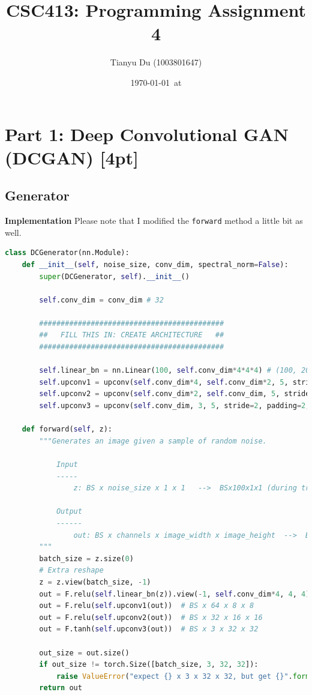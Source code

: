 \documentclass{article}
\title{CSC413: Programming Assignment 4}
\date{\today\ at \currenttime}
\author{Tianyu Du (1003801647)}
\begin{document}
	\maketitle
	\section{Part 1: Deep Convolutional GAN (DCGAN) [4pt]}
	\subsection{Generator}
	\textbf{Implementation} Please note that I modified the \texttt{forward} method a little bit as well.
	\begin{lstlisting}[language=python]
class DCGenerator(nn.Module):
    def __init__(self, noise_size, conv_dim, spectral_norm=False):
        super(DCGenerator, self).__init__()

        self.conv_dim = conv_dim # 32

        ###########################################
        ##   FILL THIS IN: CREATE ARCHITECTURE   ##
        ###########################################

        self.linear_bn = nn.Linear(100, self.conv_dim*4*4*4) # (100, 2048)
        self.upconv1 = upconv(self.conv_dim*4, self.conv_dim*2, 5, stride=2, padding=2, batch_norm=True, spectral_norm=spectral_norm)
        self.upconv2 = upconv(self.conv_dim*2, self.conv_dim, 5, stride=2, padding=2, batch_norm=True, spectral_norm=spectral_norm)
        self.upconv3 = upconv(self.conv_dim, 3, 5, stride=2, padding=2, batch_norm=True, spectral_norm=spectral_norm)

    def forward(self, z):
        """Generates an image given a sample of random noise.

            Input
            -----
                z: BS x noise_size x 1 x 1   -->  BSx100x1x1 (during training)

            Output
            ------
                out: BS x channels x image_width x image_height  -->  BSx3x32x32 (during training)
        """
        batch_size = z.size(0)
        # Extra reshape
        z = z.view(batch_size, -1)
        out = F.relu(self.linear_bn(z)).view(-1, self.conv_dim*4, 4, 4)    # BS x 128 x 4 x 4
        out = F.relu(self.upconv1(out))  # BS x 64 x 8 x 8
        out = F.relu(self.upconv2(out))  # BS x 32 x 16 x 16
        out = F.tanh(self.upconv3(out))  # BS x 3 x 32 x 32
        
        out_size = out.size()
        if out_size != torch.Size([batch_size, 3, 32, 32]):
            raise ValueError("expect {} x 3 x 32 x 32, but get {}".format(batch_size, out_size))
        return out

	\end{lstlisting}
\end{document}
